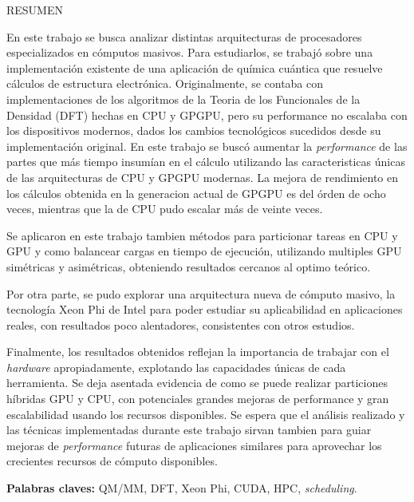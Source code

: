 \begin{center}
\large \textsc{RESUMEN}
\end{center}
\vspace{1cm}

\noindent

En este trabajo se busca analizar distintas arquitecturas de procesadores especializados
en c\'omputos masivos. Para estudiarlos, se trabaj\'o sobre una implementaci\'on existente
de una aplicaci\'on de qu\'imica cu\'antica que resuelve c\'alculos de estructura electr\'onica.
Originalmente, se contaba con implementaciones de los algoritmos de la Teoria de los
Funcionales de la Densidad (DFT) hechas en CPU y GPGPU, pero su performance no escalaba con los
dispositivos modernos, dados los cambios tecnol\'ogicos sucedidos desde su implementaci\'on original.
En este trabajo se busc\'o
aumentar la \textit{performance} de las partes que m\'as tiempo insum\'ian en el c\'alculo utilizando
las caracteristicas \'unicas de las arquitecturas de CPU y GPGPU modernas. La mejora de
rendimiento en los c\'alculos obtenida en la generacion actual de GPGPU es del \'orden de ocho
veces, mientras que la de CPU pudo escalar m\'as de veinte veces.

Se aplicaron en este trabajo tambien m\'etodos para particionar tareas en CPU y GPU y como
balancear cargas en tiempo de ejecuci\'on, utilizando multiples GPU sim\'etricas y asim\'etricas,
obteniendo resultados cercanos al optimo te\'orico.

Por otra parte, se pudo explorar una arquitectura nueva de c\'omputo masivo, la
tecnolog\'ia Xeon Phi de Intel para poder estudiar su aplicabilidad en aplicaciones reales, con
resultados poco alentadores, consistentes con otros estudios.

Finalmente, los resultados obtenidos reflejan la importancia de trabajar con el \textit{hardware}
apropiadamente, explotando las capacidades \'unicas de cada herramienta. Se deja asentada evidencia
de como se puede realizar particiones h\'ibridas GPU y CPU, con potenciales grandes mejoras
de performance y gran escalabilidad usando los recursos disponibles. Se espera que el an\'alisis
realizado y las t\'ecnicas implementadas durante este trabajo sirvan tambien para guiar mejoras
de \textit{performance} futuras de aplicaciones similares para aprovechar los crecientes recursos de c\'omputo
disponibles.

\bigskip

\noindent\textbf{Palabras claves:} QM/MM, DFT, Xeon Phi, CUDA, HPC, \textit{scheduling}.
